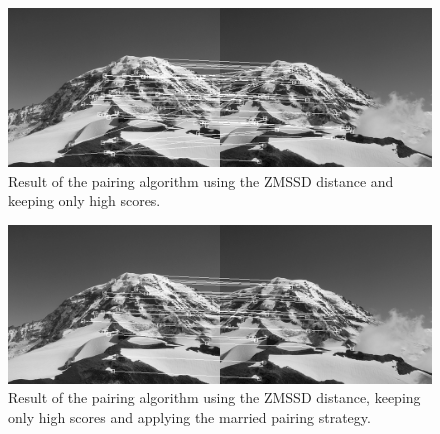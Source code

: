 \documentclass[a4paper,twocolumn]{article}
\begin{document}
\begin{figure}[h!]
\centering\includegraphics[width=\textwidth]{images/pairs_zmssd_highscore.png}
\caption{Result of the pairing algorithm using the ZMSSD distance and keeping only high scores.}
\label{pairs_zmssd_highscore}
\end{figure}

\begin{figure}[h!]
\centering\includegraphics[width=\textwidth]{images/pairs_zmssd_highscore_reciprocity.png}
\caption{Result of the pairing algorithm using the ZMSSD distance, keeping only high scores and applying the married pairing strategy.}
\label{pairs_zmssd_highscore_reciprocity}
\vspace{1cm}
\end{figure}
\end{document}

